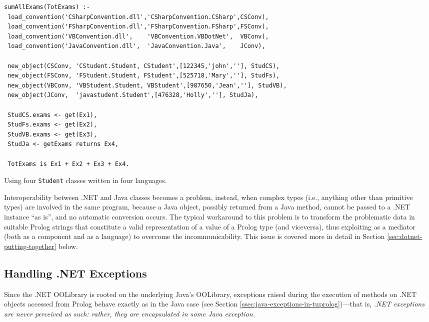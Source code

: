 \begin{table}
{\footnotesize
\begin{verbatim}
sumAllExams(TotExams) :-
 load_convention('CSharpConvention.dll','CSharpConvention.CSharp',CSConv),
 load_convention('FSharpConvention.dll','FSharpConvention.FSharp',FSConv),
 load_convention('VBConvention.dll',    'VBConvention.VBDotNet',  VBConv),
 load_convention('JavaConvention.dll',  'JavaConvention.Java',    JConv),

 new_object(CSConv, 'CStudent.Student, CStudent',[122345,'john',''], StudCS),
 new_object(FSConv, 'FStudent.Student, FStudent',[525718,'Mary',''], StudFs),
 new_object(VBConv, 'VBStudent.Student, VBStudent',[987650,'Jean',''], StudVB),
 new_object(JConv,  'javastudent.Student',[476328,'Holly',''], StudJa),

 StudCS.exams <- get(Ex1),
 StudFs.exams <- get(Ex2),
 StudVB.exams <- get(Ex3),
 StudJa <- getExams returns Ex4,

 TotExams is Ex1 + Ex2 + Ex3 + Ex4.
\end{verbatim}
}
  \caption{Using four \texttt{Student} classes written in four languages.}
  \label{tab:dotnet-oolibrary-examples3}
\end{table}

Interoperability between .NET and Java classes becomes a problem, instead, when complex types (i.e., anything other than primitive types) are involved in the same \tuprolog{} program, because a Java object, possibly returned from a Java method, cannot be passed to a .NET instance ``as is'', and no automatic conversion occurs.
%
The typical workaround to this problem is to transform the problematic data in suitable Prolog strings that constitute a valid \tuprolog{} representation of a value of a Prolog type (and viceversa), thus exploiting \tuprolog{} as a mediator (both as a component and as a language) to overcome the incommunicability.
%
This issue is covered more in detail in Section \ref{sec:dotnet-putting-together} below.

\subsection{Handling .NET Exceptions}
\label{ssec:dotnet-oolibrary-exceptions}

Since the .NET OOLibrary is rooted on the underlying Java's OOLibrary, exceptions raised during the execution of methods on .NET objects accessed from Prolog behave exactly as in the Java case (see Section \ref{ssec:java-exceptions-in-tuprolog})---that is, \textit{.NET exceptions are never perceived as such: rather, they are encapsulated in some Java exception.}

